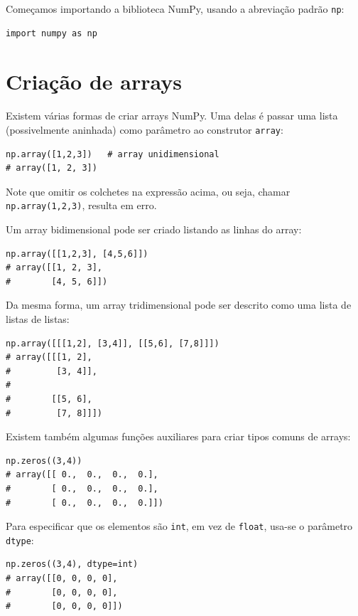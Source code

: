 \documentclass[11pt,a4paper]{article}
\begin{document}
Começamos importando a biblioteca NumPy, usando a abreviação padrão
\texttt{np}:

\begin{lstlisting}
import numpy as np
\end{lstlisting}

\section{Criação de arrays}

Existem várias formas de criar arrays NumPy. Uma delas é passar uma
lista (possivelmente aninhada) como parâmetro ao construtor
\texttt{array}:

\begin{lstlisting}
np.array([1,2,3])   # array unidimensional
# array([1, 2, 3])
\end{lstlisting}

Note que omitir os colchetes na expressão acima, ou seja, chamar
\texttt{np.array(1,2,3)}, resulta em erro.

Um array bidimensional pode ser criado listando as linhas do array:

\begin{lstlisting}
np.array([[1,2,3], [4,5,6]])
# array([[1, 2, 3],
#        [4, 5, 6]])
\end{lstlisting}

Da mesma forma, um array tridimensional pode ser descrito como uma
lista de listas de listas:

\begin{lstlisting}
np.array([[[1,2], [3,4]], [[5,6], [7,8]]])
# array([[[1, 2],
#         [3, 4]],
#
#        [[5, 6],
#         [7, 8]]])
\end{lstlisting}

Existem também algumas funções auxiliares para criar tipos comuns de
arrays:

\begin{lstlisting}
np.zeros((3,4))
# array([[ 0.,  0.,  0.,  0.],
#        [ 0.,  0.,  0.,  0.],
#        [ 0.,  0.,  0.,  0.]])
\end{lstlisting}

Para especificar que os elementos são \texttt{int}, em vez de
\texttt{float}, usa-se o parâmetro \texttt{dtype}:

\begin{lstlisting}
np.zeros((3,4), dtype=int)
# array([[0, 0, 0, 0],
#        [0, 0, 0, 0],
#        [0, 0, 0, 0]])
\end{lstlisting}
\end{document}
